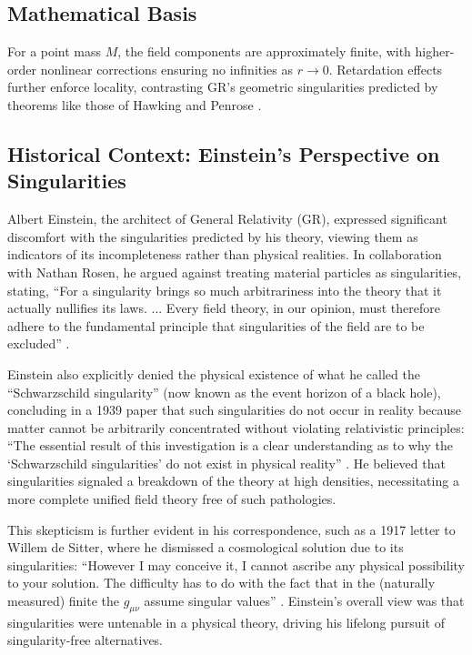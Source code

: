\documentclass{article}
\begin{document}
\subsection{Mathematical Basis}

For a point mass \( M \), the field components are approximately finite, with higher-order nonlinear corrections ensuring no infinities as \( r \to 0 \). Retardation effects further enforce locality, contrasting GR's geometric singularities predicted by theorems like those of Hawking and Penrose \cite{Penrose1965}\cite{HawkingPenrose1970}.

\subsection{Historical Context: Einstein's Perspective on Singularities}

Albert Einstein, the architect of General Relativity (GR), expressed significant discomfort with the singularities predicted by his theory, viewing them as indicators of its incompleteness rather than physical realities. In collaboration with Nathan Rosen, he argued against treating material particles as singularities, stating, ``For a singularity brings so much arbitrariness into the theory that it actually nullifies its laws. ... Every field theory, in our opinion, must therefore adhere to the fundamental principle that singularities of the field are to be excluded'' \cite{EinsteinRosen1935}.

Einstein also explicitly denied the physical existence of what he called the ``Schwarzschild singularity'' (now known as the event horizon of a black hole), concluding in a 1939 paper that such singularities do not occur in reality because matter cannot be arbitrarily concentrated without violating relativistic principles: ``The essential result of this investigation is a clear understanding as to why the `Schwarzschild singularities' do not exist in physical reality'' \cite{Einstein1939}. He believed that singularities signaled a breakdown of the theory at high densities, necessitating a more complete unified field theory free of such pathologies.

This skepticism is further evident in his correspondence, such as a 1917 letter to Willem de Sitter, where he dismissed a cosmological solution due to its singularities: ``However I may conceive it, I cannot ascribe any physical possibility to your solution. The difficulty has to do with the fact that in the (naturally measured) finite the $g_{\mu\nu}$ assume singular values'' \cite{EinsteinDeSitter1917}. Einstein's overall view was that singularities were untenable in a physical theory, driving his lifelong pursuit of singularity-free alternatives.
\end{document}
